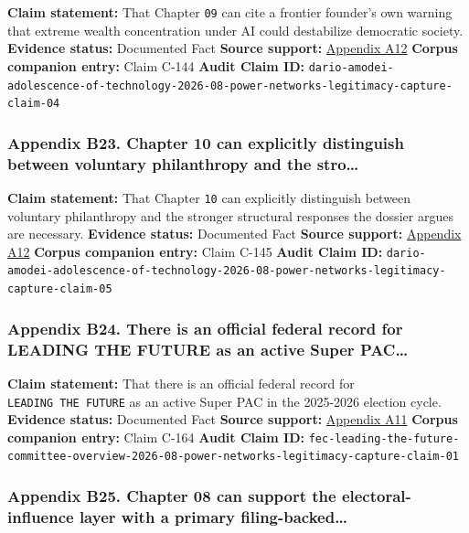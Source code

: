\documentclass[
  american,
  11pt,
  letterpaper,
]{article}
\begin{document}
\textbf{Claim statement:} That Chapter \texttt{09} can cite a frontier
founder's own warning that extreme wealth concentration under AI could
destabilize democratic society. \textbf{Evidence status:} Documented
Fact \textbf{Source support:}
\hyperref[appendix-a12-the-adolescence-of-technology]{Appendix A12}
\textbf{Corpus companion entry:} Claim C-144 \textbf{Audit Claim ID:}
\texttt{dario-amodei-adolescence-of-technology-2026-08-power-networks-legitimacy-capture-claim-04}

\subsubsection{Appendix B23. Chapter 10 can explicitly distinguish
between voluntary philanthropy and the
stro\ldots{}}\label{appendix-b23-chapter-10-can-explicitly-distinguish-between-voluntary-philanthropy-and-the-stro}

\textbf{Claim statement:} That Chapter \texttt{10} can explicitly
distinguish between voluntary philanthropy and the stronger structural
responses the dossier argues are necessary. \textbf{Evidence status:}
Documented Fact \textbf{Source support:}
\hyperref[appendix-a12-the-adolescence-of-technology]{Appendix A12}
\textbf{Corpus companion entry:} Claim C-145 \textbf{Audit Claim ID:}
\texttt{dario-amodei-adolescence-of-technology-2026-08-power-networks-legitimacy-capture-claim-05}

\subsubsection{Appendix B24. There is an official federal record for
LEADING THE FUTURE as an active Super
PAC\ldots{}}\label{appendix-b24-there-is-an-official-federal-record-for-leading-the-future-as-an-active-super-pac}

\textbf{Claim statement:} That there is an official federal record for
\texttt{LEADING\ THE\ FUTURE} as an active Super PAC in the 2025-2026
election cycle. \textbf{Evidence status:} Documented Fact \textbf{Source
support:}
\hyperref[appendix-a11-leading-the-future-committee-overview]{Appendix
A11} \textbf{Corpus companion entry:} Claim C-164 \textbf{Audit Claim
ID:}
\texttt{fec-leading-the-future-committee-overview-2026-08-power-networks-legitimacy-capture-claim-01}

\subsubsection{Appendix B25. Chapter 08 can support the
electoral-influence layer with a primary
filing-backed\ldots{}}\label{appendix-b25-chapter-08-can-support-the-electoral-influence-layer-with-a-primary-filing-backed}
\end{document}
